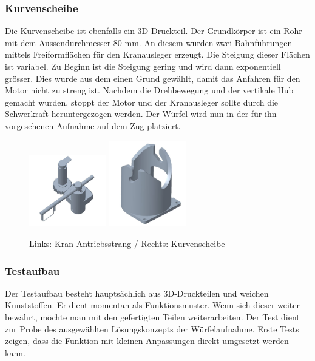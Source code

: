 \documentclass[../../main.tex]{subfiles}
\begin{document}
        \subsubsection{Kurvenscheibe}
        Die Kurvenscheibe ist ebenfalls ein 3D-Druckteil. Der Grundkörper ist ein Rohr mit dem Aussendurchmesser 80 mm. An diesem wurden zwei Bahnführungen mittels Freiformflächen für den Kranausleger erzeugt. Die Steigung dieser Flächen ist variabel. Zu Beginn ist die Steigung gering und wird dann exponentiell grösser. Dies wurde aus dem einen Grund gewählt, damit das Anfahren für den Motor nicht zu streng ist. Nachdem die Drehbewegung und der vertikale Hub gemacht wurden, stoppt der Motor und der Kranausleger sollte durch die Schwerkraft heruntergezogen werden. Der Würfel wird nun in der für ihn vorgesehenen Aufnahme auf dem Zug platziert.\\


        \begin{figure}[H]
            \centering
            \includegraphics[width=0.3\textwidth]{Mechanismus.JPG}
            \hspace{1.5cm}
            \includegraphics[width=0.3\textwidth]{Kurvenscheibe.JPG}
            \caption {Links: Kran Antriebsstrang / Rechts: Kurvenscheibe}
        \end{figure}
    

        \subsubsection{Testaufbau}
        Der Testaufbau besteht hauptsächlich aus 3D-Druckteilen und weichen Kunststoffen. Er dient momentan als Funktionsmuster. Wenn sich dieser weiter bewährt, möchte man mit den gefertigten Teilen weiterarbeiten. Der Test dient zur Probe des ausgewählten Lösungskonzepts der Würfelaufnahme. Erste Tests zeigen, dass die Funktion mit kleinen Anpassungen direkt umgesetzt werden kann.
\end{document}
